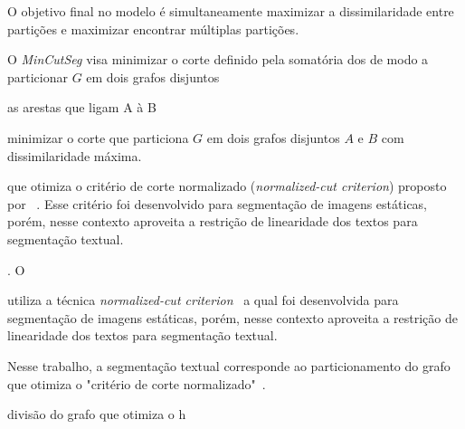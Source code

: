 O objetivo final no modelo é simultaneamente maximizar a dissimilaridade entre partições e maximizar
encontrar múltiplas partições. 






O \textit{MinCutSeg} visa minimizar o corte definido pela somatória dos de modo a particionar $G$ em dois grafos disjuntos


as arestas que ligam A à B

minimizar o corte que particiona $G$ em dois grafos disjuntos $A$ e $B$ com dissimilaridade máxima. 



que otimiza o critério de corte normalizado (\textit{normalized-cut criterion}) proposto por ~\cite{Shi2000}. Esse critério foi desenvolvido para segmentação de imagens estáticas, porém, nesse contexto aproveita a restrição de linearidade dos textos para segmentação textual.



. O 




utiliza a técnica \textit{normalized-cut criterion}~\cite{Shi2000} a qual foi desenvolvida para segmentação de imagens estáticas, porém, nesse contexto aproveita a restrição de linearidade dos textos para segmentação textual.


Nesse trabalho, a segmentação textual corresponde ao particionamento do grafo que otimiza o "critério de corte normalizado"~\cite{Shi2000}.



divisão do grafo que otimiza o h



